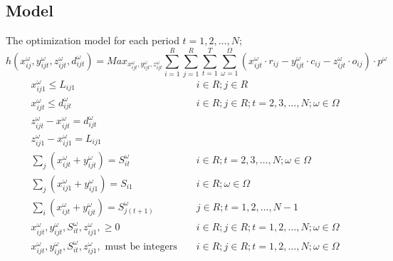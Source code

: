 \subsection{Model}
The optimization model for each period $t=1,2, \ldots, N ;$\\
\begin{equation}
h(x_{i j}^{\omega},y_{i j t}^{\omega},z_{i j t}^{\omega},d_{i j t}^{\omega}) = {Max }_{x_{i j t}^{\omega},y_{i j t}^{\omega},z_{i j t}^{\omega}}\sum_{i=1}^{R} \sum_{j=1}^{R} \sum_{t=1}^{T} \sum_{\omega=1}^{\Omega}(x_{i j t}^{\omega}\cdot r_{i j} - y_{i j t}^{\omega} \cdot c_{i j} - z_{i j t}^{\omega} \cdot o_{i j})\cdot p^{\omega}
\end{equation}
\begin{align}
x_{i j 1}^{\omega} \leq L_{i j 1} & & i \in R ; j \in R \\
x_{i j t}^{\omega} \leq d_{i j t}^{\omega} & & i \in R ; j \in R ; t=2,3, \ldots, N ; \omega \in \Omega \\
z_{i j t}^{\omega} - x_{i j t}^{\omega} = d_{i j t}^{\omega} \\
z_{i j 1}^{\omega} - x_{i j 1}^{\omega} = L_{i j 1} \\
\sum_{j}\left(x_{i j t}^{\omega}+y_{i j t}^{\omega}\right)=S_{i t}^{\omega} & & i \in R ; t=2,3, \ldots, N ; \omega \in \Omega \\
\sum_{j}\left(x_{i j 1}^{\omega}+y_{i j 1}^{\omega}\right)=S_{i 1} & & i \in R ; \omega \in \Omega \\
\sum_{i}\left(x_{i j t}^{\omega}+y_{i j t}^{\omega}\right)=S_{j(t+1)}^{\omega} & & j \in R ; t=1,2, \ldots, N-1\\
x_{i j t}^{\omega}, y_{i j t}^{\omega}, S_{i t}^{\omega},z_{i j 1}^{\omega}, \geq 0 & & i \in R ; j \in R ; t=1,2, \ldots, N ; \omega \in \Omega\\
x_{i j t}^{\omega}, y_{i j t}^{\omega}, S_{i t}^{\omega},z_{i j 1}^{\omega}, \text { must be integers } & & i \in R ; j \in R ; t=1,2, \ldots, N ; \omega \in \Omega
\end{align}
\\
